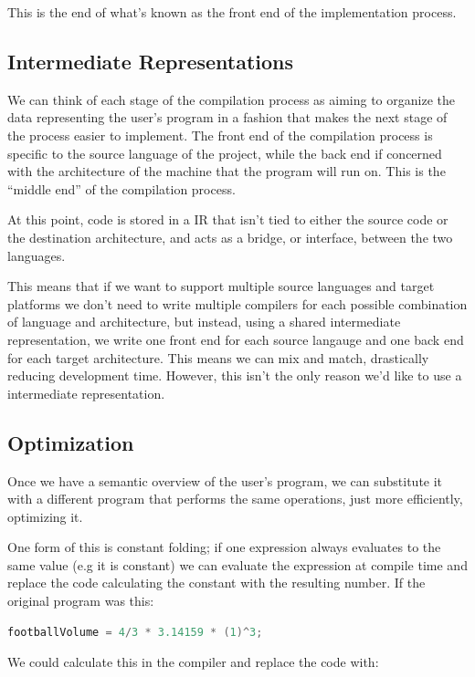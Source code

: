 {This is the end of what's known as the front end of the implementation process. 

\subsection{Intermediate Representations}

We can think of each stage of the compilation process as aiming to organize the data representing the user's program in a fashion that makes the next stage of the process easier to implement. The front end of the compilation process is specific to the source language of the project, while the back end if concerned with the architecture of the machine that the program will run on. This is the ``middle end'' of the compilation process. 

At this point, code is stored in a \ac{IR} that isn't tied to either the source code or the destination architecture, and acts as a bridge, or interface, between the two languages. 

This means that if we want to support multiple source languages and target platforms we don't need to write multiple compilers for each possible combination of language and architecture, but instead, using a shared intermediate representation, we write one front end for each source langauge and one back end for each target architecture. This means we can mix and match, drastically reducing development time. However, this isn't the only reason we'd like to use a intermediate representation.

\subsection{Optimization}

Once we have a semantic overview of the user's program, we can substitute it with a different program that performs the same operations, just more efficiently, optimizing it. 

One form of this is constant folding; if one expression always evaluates to the same value (e.g it is constant) we can evaluate the expression at compile time and replace the code calculating the constant with the resulting number. If the original program was this:

\begin{lstlisting}[language=C++]
footballVolume = 4/3 * 3.14159 * (1)^3;
\end{lstlisting}

We could calculate this in the compiler and replace the code with:

}
